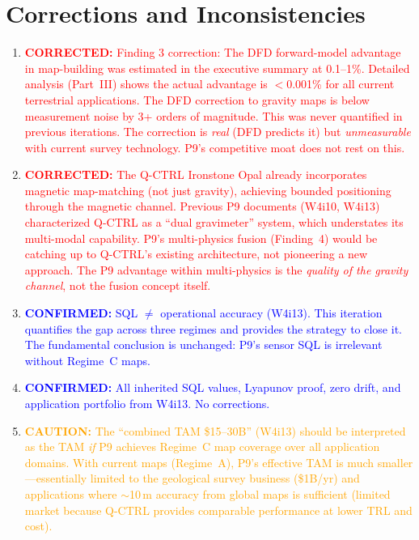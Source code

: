 \documentclass[11pt]{article}
\theoremstyle{definition}
\theoremstyle{remark}
\newcommand{\confirmed}[1]{\textcolor{blue}{\textbf{CONFIRMED:} #1}}
\newcommand{\corrected}[1]{\textcolor{red}{\textbf{CORRECTED:} #1}}
\newcommand{\caution}[1]{\textcolor{orange}{\textbf{CAUTION:} #1}}
\begin{document}
\section{Corrections and Inconsistencies}
\label{sec:corrections}

\begin{enumerate}
\item \corrected{Finding 3 correction: The DFD forward-model advantage
  in map-building was estimated in the executive summary at 0.1--1\%.
  Detailed analysis (Part~III) shows the actual advantage is
  $<$0.001\% for all current terrestrial applications. The DFD
  correction to gravity maps is below measurement noise by 3+ orders
  of magnitude. This was never quantified in previous iterations.
  The correction is \emph{real} (DFD predicts it) but \emph{unmeasurable}
  with current survey technology. P9's competitive moat does not rest
  on this.}

\item \corrected{The Q-CTRL Ironstone Opal already incorporates
  magnetic map-matching (not just gravity), achieving bounded
  positioning through the magnetic channel. Previous P9 documents
  (W4i10, W4i13) characterized Q-CTRL as a ``dual gravimeter''
  system, which understates its multi-modal capability. P9's
  multi-physics fusion (Finding~4) would be catching up to Q-CTRL's
  existing architecture, not pioneering a new approach. The P9
  advantage within multi-physics is the \emph{quality of the gravity
  channel}, not the fusion concept itself.}

\item \confirmed{SQL $\neq$ operational accuracy (W4i13). This
  iteration quantifies the gap across three regimes and provides
  the strategy to close it. The fundamental conclusion is unchanged:
  P9's sensor SQL is irrelevant without Regime~C maps.}

\item \confirmed{All inherited SQL values, Lyapunov proof, zero drift,
  and application portfolio from W4i13. No corrections.}

\item \caution{The ``combined TAM \$15--30B'' (W4i13) should be
  interpreted as the TAM \emph{if} P9 achieves Regime~C map coverage
  over all application domains. With current maps (Regime~A), P9's
  effective TAM is much smaller---essentially limited to the geological
  survey business (\$1B/yr) and applications where $\sim$10\,m accuracy
  from global maps is sufficient (limited market because Q-CTRL
  provides comparable performance at lower TRL and cost).}
\end{enumerate}
\end{document}
